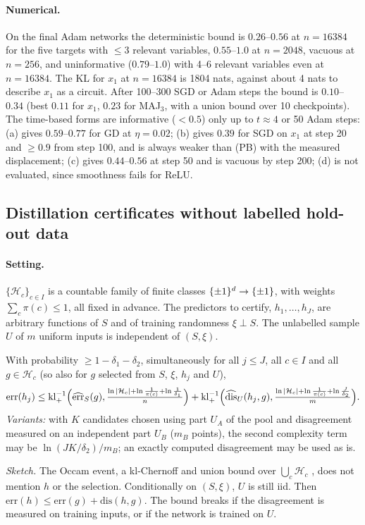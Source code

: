 \paragraph{Numerical.} On the final Adam networks the deterministic bound is $0.26$--$0.56$ at $n=16384$ for the five targets with $\le3$ relevant variables, $0.55$--$1.0$ at $n=2048$, vacuous at $n=256$, and uninformative ($0.79$--$1.0$) with 4--6 relevant variables even at $n=16384$. The KL for $x_1$ at $n=16384$ is 1804 nats, against about 4 nats to describe $x_1$ as a circuit. After 100--300 SGD or Adam steps the bound is $0.10$--$0.34$ (best $0.11$ for $x_1$, $0.23$ for MAJ$_3$, with a union bound over 10 checkpoints). The time-based forms are informative ($<0.5$) only up to $t\approx4$ or 50 Adam steps: (a) gives $0.59$--$0.77$ for GD at $\eta=0.02$; (b) gives $0.39$ for SGD on $x_1$ at step 20 and $\ge0.9$ from step 100, and is always weaker than (PB) with the measured displacement; (c) gives $0.44$--$0.56$ at step 50 and is vacuous by step 200; (d) is not evaluated, since smoothness fails for ReLU.

\subsection{Distillation certificates without labelled hold-out data}\label{app:networks:certificates}

\paragraph{Setting.} $\{\mathcal H_c\}_{c\in I}$ is a countable family of finite classes $\{\pm1\}^d\to\{\pm1\}$, with weights $\sum_c\pi(c)\le1$, all fixed in advance. The predictors to certify, $h_1,\dots,h_J$, are arbitrary functions of $S$ and of training randomness $\xi\perp S$. The unlabelled sample $U$ of $m$ uniform inputs is independent of $(S,\xi)$.

\begin{theorem}[Theorem C1]\label{thm:C1}
With probability $\ge1-\delta_1-\delta_2$, simultaneously for all $j\le J$, all $c\in I$ and all $g\in\mathcal H_c$ (so also for $g$ selected from $S$, $\xi$, $h_j$ and $U$),
\[
\mathrm{err}(h_j)\le\mathrm{kl}^{-1}_+\Bigl(\widehat{\mathrm{err}}_S(g),\tfrac{\ln|\mathcal H_c|+\ln\frac1{\pi(c)}+\ln\frac1{\delta_1}}n\Bigr)+\mathrm{kl}^{-1}_+\Bigl(\widehat{\mathrm{dis}}_U(h_j,g),\tfrac{\ln|\mathcal H_c|+\ln\frac1{\pi(c)}+\ln\frac J{\delta_2}}m\Bigr).
\]
\emph{Variants:} with $K$ candidates chosen using part $U_A$ of the pool and disagreement measured on an independent part $U_B$ ($m_B$ points), the second complexity term may be $\ln(JK/\delta_2)/m_B$; an exactly computed disagreement may be used as is.
\end{theorem}
\noindent\emph{Sketch.} The Occam event, a kl-Chernoff and union bound over $\bigcup_c\mathcal H_c$ \cite{blumer1987occam}, does not mention $h$ or the selection. Conditionally on $(S,\xi)$, $U$ is still iid. Then $\mathrm{err}(h)\le\mathrm{err}(g)+\mathrm{dis}(h,g)$. The bound breaks if the disagreement is measured on training inputs, or if the network is trained on $U$.

